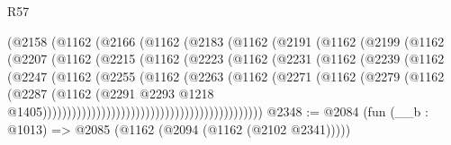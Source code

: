 \begin{lexlean}{R57}
\begin{coremodule}
                            (@2158
                              (@1162
                                (@2166
                                  (@1162
                                    (@2183
                                      (@1162
                                        (@2191
                                          (@1162
                                            (@2199
                                              (@1162
                                                (@2207
                                                  (@1162
                                                    (@2215
                                                      (@1162
                                                        (@2223
                                                          (@1162
                                                            (@2231
                                                              (@1162
                                                                (@2239
                                                                  (@1162
                                                                    (@2247
                                                                      (@1162
                                                                        (@2255
                                                                          (@1162
                                                                            (@2263
                                                                              (@1162
                                                                                (@2271
                                                                                  (@1162
                                                                                    (@2279
                                                                                      (@1162
                                                                                        (@2287
                                                                                          (@1162
                                                                                            (@2291
                                                                                              @2293
                                                                                              @1218
                                                                                              @1405)))))))))))))))))))))))))))))))))))))))))))))
@2348 := @2084 (fun (__b : @1013) => @2085 (@1162 (@2094 (@1162 (@2102 @2341)))))

\end{coremodule}
\end{lexlean}
